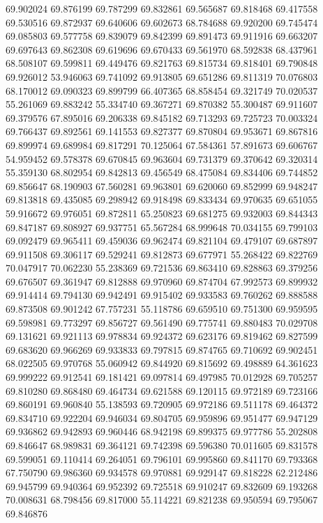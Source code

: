 69.902024
69.876199
69.787299
69.832861
69.565687
69.818468
69.417558
69.530516
69.872937
69.640606
69.602673
68.784688
69.920200
69.745474
69.085803
69.577758
69.839079
69.842399
69.891473
69.911916
69.663207
69.697643
69.862308
69.619696
69.670433
69.561970
68.592838
68.437961
68.508107
69.599811
69.449476
69.821763
69.815734
69.818401
69.790848
69.926012
53.946063
69.741092
69.913805
69.651286
69.811319
70.076803
68.170012
69.090323
69.899799
66.407365
68.858454
69.321749
70.020537
55.261069
69.883242
55.334740
69.367271
69.870382
55.300487
69.911607
69.379576
67.895016
69.206338
69.845182
69.713293
69.725723
70.003324
69.766437
69.892561
69.141553
69.827377
69.870804
69.953671
69.867816
69.899974
69.689984
69.817291
70.125064
67.584361
57.891673
69.606767
54.959452
69.578378
69.670845
69.963604
69.731379
69.370642
69.320314
55.359130
68.802954
69.842813
69.456549
68.475084
69.834406
69.744852
69.856647
68.190903
67.560281
69.963801
69.620060
69.852999
69.948247
69.813818
69.435085
69.298942
69.918498
69.833434
69.970635
69.651055
59.916672
69.976051
69.872811
65.250823
69.681275
69.932003
69.844343
69.847187
69.808927
69.937751
65.567284
68.999648
70.034155
69.799103
69.092479
69.965411
69.459036
69.962474
69.821104
69.479107
69.687897
69.911508
69.306117
69.529241
69.812873
69.677971
55.268422
69.822769
70.047917
70.062230
55.238369
69.721536
69.863410
69.828863
69.379256
69.676507
69.361947
69.812888
69.970960
69.874704
67.992573
69.899932
69.914414
69.794130
69.942491
69.915402
69.933583
69.760262
69.888588
69.873508
69.901242
67.757231
55.118786
69.659510
69.751300
69.959595
69.598981
69.773297
69.856727
69.561490
69.775741
69.880483
70.029708
69.131621
69.921113
69.978834
69.924372
69.623176
69.819462
69.827599
69.683620
69.966269
69.933833
69.797815
69.874765
69.710692
69.902451
68.022505
69.970768
55.060942
69.844920
69.815692
69.498889
64.361623
69.999222
69.912541
69.181421
69.097814
69.497985
70.012928
69.705257
69.810280
69.868480
69.464734
69.621588
69.120115
69.972189
69.723166
69.860191
69.960840
55.138593
69.720905
69.972186
69.511178
69.464372
69.834710
69.922204
69.946034
69.804705
69.959896
69.951477
69.947129
69.936862
69.942893
69.960446
68.942198
69.899375
69.977786
55.202808
69.846647
68.989831
69.364121
69.742398
69.596380
70.011605
69.831578
69.599051
69.110414
69.264051
69.796101
69.995860
69.841170
69.793368
67.750790
69.986360
69.934578
69.970881
69.929147
69.818228
62.212486
69.945799
69.940364
69.952392
69.725518
69.910247
69.832609
69.193268
70.008631
68.798456
69.817000
55.114221
69.821238
69.950594
69.795067
69.846876
